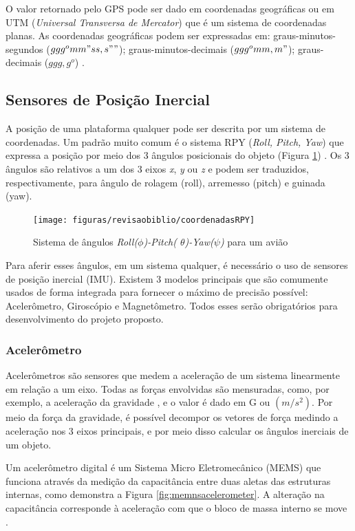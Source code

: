O valor retornado pelo GPS pode ser dado em coordenadas geográficas ou em UTM (\textit{Universal Transversa de Mercator}) que é um sistema de coordenadas planas. As coordenadas geográficas podem ser expressadas em: graus-minutos-segundos ($ ggg^o mm" ss,s"" $); graus-minutos-decimais ($ ggg^o mm,m" $); graus-decimais ($ ggg,g^o $) \cite{apostilagps}. 


\subsection{Sensores de Posição Inercial}

A posição de uma plataforma qualquer pode ser descrita por um sistema de coordenadas. Um padrão muito comum é o sistema RPY (\textit{Roll, Pitch, Yaw}) que expressa a posição por meio dos 3 ângulos posicionais do objeto (Figura \ref{fig:RPY}) \cite{diss:FabioAUV}. Os 3 ângulos são relativos a um dos 3 eixos \textit{x}, \textit{y} ou \textit{z} e podem ser traduzidos, respectivamente, para ângulo de rolagem (roll), arremesso (pitch) e guinada (yaw).

\begin{figure}[!htb]
	\centering
	\caption{Sistema de ângulos \textit{Roll($\phi $)-Pitch( $ \theta$)-Yaw($ \psi $)} para um avião}
	\texttt{[image: figuras/revisaobiblio/coordenadasRPY]}
	\label{fig:RPY}
\end{figure}

Para aferir esses ângulos, em um sistema qualquer, é necessário o uso de sensores de posição inercial (IMU). Existem 3 modelos principais que são comumente usados de forma integrada para fornecer o máximo de precisão possível: Acelerômetro, Giroscópio e Magnetômetro. Todos esses serão obrigatórios para desenvolvimento do projeto proposto.

\subsubsection{Acelerômetro}

Acelerômetros são sensores que medem a aceleração de um sistema linearmente em relação a um eixo. Todas as forças envolvidas são mensuradas, como, por exemplo, a aceleração da gravidade \cite{diss:FabioAUV}, e o valor é dado em G ou $ (m/s^2) $. Por meio da força da gravidade, é possível decompor os vetores de força medindo a aceleração nos 3 eixos principais, e por meio disso calcular os ângulos inerciais de um objeto.

Um acelerômetro digital é um Sistema Micro Eletromecânico (MEMS) que funciona através da medição da capacitância entre duas aletas das estruturas internas, como demonstra a Figura \ref{fig:memnsacelerometer}. A alteração na capacitância corresponde à aceleração com que o bloco de massa interno se move \cite{site:MEMSHOTO}. 


